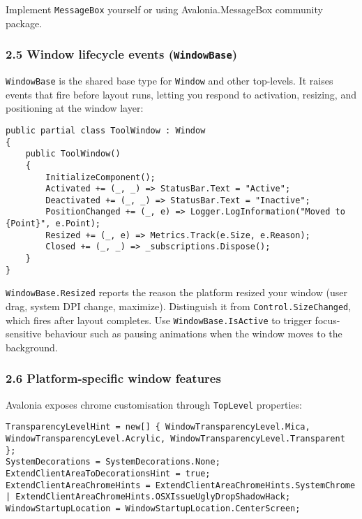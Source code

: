 Implement \passthrough{\lstinline!MessageBox!} yourself or using
Avalonia.MessageBox community package.

\subsubsection{\texorpdfstring{2.5 Window lifecycle events
(\texttt{WindowBase})}{2.5 Window lifecycle events (WindowBase)}}\label{window-lifecycle-events-windowbase}

\passthrough{\lstinline!WindowBase!} is the shared base type for
\passthrough{\lstinline!Window!} and other top-levels. It raises events
that fire before layout runs, letting you respond to activation,
resizing, and positioning at the window layer:

\begin{lstlisting}
public partial class ToolWindow : Window
{
    public ToolWindow()
    {
        InitializeComponent();
        Activated += (_, _) => StatusBar.Text = "Active";
        Deactivated += (_, _) => StatusBar.Text = "Inactive";
        PositionChanged += (_, e) => Logger.LogInformation("Moved to {Point}", e.Point);
        Resized += (_, e) => Metrics.Track(e.Size, e.Reason);
        Closed += (_, _) => _subscriptions.Dispose();
    }
}
\end{lstlisting}

\passthrough{\lstinline!WindowBase.Resized!} reports the reason the
platform resized your window (user drag, system DPI change, maximize).
Distinguish it from \passthrough{\lstinline!Control.SizeChanged!}, which
fires after layout completes. Use
\passthrough{\lstinline!WindowBase.IsActive!} to trigger focus-sensitive
behaviour such as pausing animations when the window moves to the
background.

\subsubsection{2.6 Platform-specific window
features}\label{platform-specific-window-features}

Avalonia exposes chrome customisation through
\passthrough{\lstinline!TopLevel!} properties:

\begin{lstlisting}
TransparencyLevelHint = new[] { WindowTransparencyLevel.Mica, WindowTransparencyLevel.Acrylic, WindowTransparencyLevel.Transparent };
SystemDecorations = SystemDecorations.None;
ExtendClientAreaToDecorationsHint = true;
ExtendClientAreaChromeHints = ExtendClientAreaChromeHints.SystemChrome | ExtendClientAreaChromeHints.OSXIssueUglyDropShadowHack;
WindowStartupLocation = WindowStartupLocation.CenterScreen;
\end{lstlisting}

